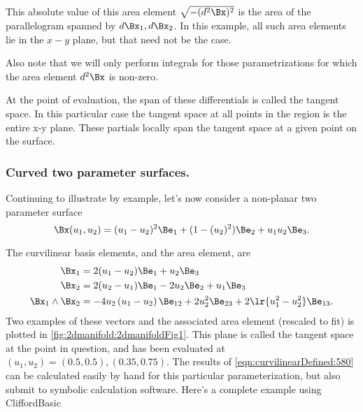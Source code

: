 This absolute value of this area element \( \sqrt{-(d^2 \Bx)^2} \) is the area of the parallelogram spanned by \( d\Bx_1, d\Bx_2 \).
In this example, all such area elements lie in the \( x-y \) plane, but that need not be the case.

Also note that we will only perform integrals for those parametrizations for which the area element \( d^2 \Bx \) is non-zero.




At the point of evaluation, the span of these differentials is called the tangent space.
In this particular case the tangent space at all points in the region is the entire x-y plane.
These partials locally span the tangent space at a given point on the surface.
\subsubsection{Curved two parameter surfaces.}
Continuing to illustrate by example, let's now consider a non-planar two parameter surface
\begin{equation}\label{eqn:curvilinearDefined:560}
\Bx(u_1, u_2) =
(u_1-u_2)^2
\Be_1
+ (1-(u_2)^2 ) \Be_2
+ u_1 u_2 \Be_3.
\end{equation}

The curvilinear basis elements, and the area element, are
\begin{equation}\label{eqn:curvilinearDefined:580}
\begin{aligned}
\Bx_1 &= 2 (u_1 - u_2) \Be_1 + u_2 \Be_3 \\
\Bx_2 &= 2 (u_2 - u_1) \Be_1 - 2 u_2 \Be_2 + u_1 \Be_3 \\
\Bx_1 \wedge \Bx_2 &=
-4 u_2
\left(u_1-u_2\right)
\Be_{12}
+2 u_2^2 \Be_{23}
+ 2
\lr{u_1^2 - u_2^2}
\Be_{13}.
\end{aligned}
\end{equation}
Two examples of these vectors and the associated area element (rescaled to fit) is plotted in
\cref{fig:2dmanifold:2dmanifoldFig1}.
This plane is called the tangent space at the point in question, and has been evaluated at \( (u_1, u_2) = (0.5,0.5), (0.35, 0.75) \).
The results of \cref{eqn:curvilinearDefined:580} can be calculated easily by hand for this particular parameterization, but also submit to symbolic calculation software.  Here's a complete example using CliffordBasic

